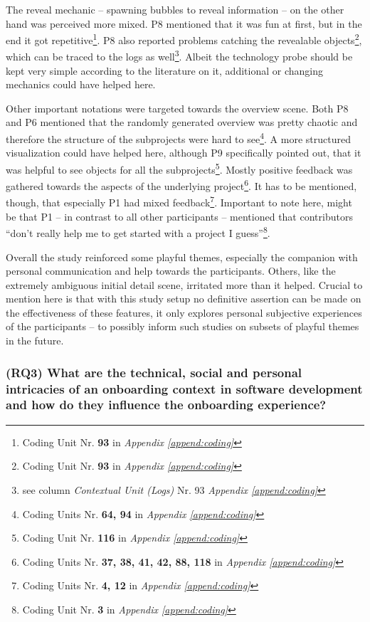 The reveal mechanic -- spawning bubbles to reveal information -- on the other hand was perceived more mixed. P8 mentioned that it was fun at first, but in the end it got repetitive\footnote{Coding Unit Nr. \textbf{93} in \textit{Appendix \ref{append:coding}}}. P8 also reported problems catching the revealable objects\footnote{Coding Unit Nr. \textbf{93} in \textit{Appendix \ref{append:coding}}}, which can be traced to the logs as well\footnote{see column \textit{Contextual Unit (Logs)} Nr. 93 \textit{Appendix \ref{append:coding}}}. Albeit the technology probe should be kept very simple according to the literature on it, additional or changing mechanics could have helped here.

Other important notations were targeted towards the overview scene. Both P8 and P6 mentioned that the randomly generated overview was pretty chaotic and therefore the structure of the subprojects were hard to see\footnote{Coding Units Nr. \textbf{64, 94} in \textit{Appendix \ref{append:coding}}}. A more structured visualization could have helped here, although P9 specifically pointed out, that it was helpful to see objects for all the subprojects\footnote{Coding Unit Nr. \textbf{116} in \textit{Appendix \ref{append:coding}}}. Mostly positive feedback was gathered towards the aspects of the underlying project\footnote{Coding Units Nr. \textbf{37, 38, 41, 42, 88, 118} in \textit{Appendix \ref{append:coding}}}. It has to be mentioned, though, that especially P1 had mixed feedback\footnote{Coding Units Nr. \textbf{4, 12} in \textit{Appendix \ref{append:coding}}}. Important to note here, might be that P1 -- in contrast to all other participants -- mentioned that contributors \enquote{don't really help me to get started with a project I guess}\footnote{Coding Unit Nr. \textbf{3} in \textit{Appendix \ref{append:coding}}}.

Overall the study reinforced some playful themes, especially the companion with personal communication and help towards the participants. Others, like the extremely ambiguous initial detail scene, irritated more than it helped. Crucial to mention here is that with this study setup no definitive assertion can be made on the effectiveness of these features, it only explores personal subjective experiences of the participants -- to possibly inform such studies on subsets of playful themes in the future.

\subsubsection*{(RQ3) What are the technical, social and personal intricacies of an onboarding context in software development and how do they influence the onboarding experience?}

